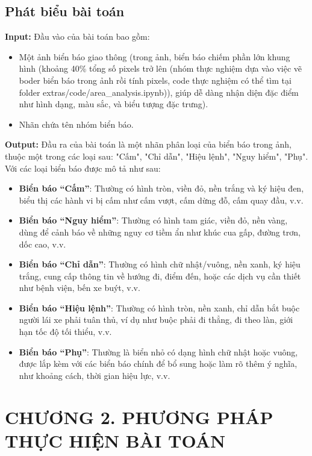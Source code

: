 \documentclass[a4paper,12pt]{article}
\begin{document}
\subsection{Phát biểu bài toán}
\textbf{Input:} Đầu vào của bài toán bao gồm: 
\begin{itemize}
    \item Một ảnh biển báo giao thông (trong ảnh, biển báo chiếm phần lớn khung hình (khoảng 40\% tổng số pixels trở lên (nhóm thực nghiệm dựa vào việc vẽ boder biển báo trong ảnh rồi tính pixels, code thực nghiệm có thể tìm tại folder extras/code/area\_analysis.ipynb)), giúp dễ dàng nhận diện đặc điểm như hình dạng, màu sắc, và biểu tượng đặc trưng).
    \item Nhãn chứa tên nhóm biển báo.
\end{itemize}
\textbf{Output:} Đầu ra của bài toán là một nhãn phân loại của biển báo trong ảnh, thuộc một trong các loại sau: "Cấm", "Chỉ dẫn", "Hiệu lệnh", "Nguy hiểm", "Phụ".\\[0.2cm]
Với các loại biển báo được mô tả như sau:
\begin{itemize}
    \item \textbf{Biển báo “Cấm”}: Thường có hình tròn, viền đỏ, nền trắng và ký hiệu đen, biểu thị các hành vi bị cấm như cấm vượt, cấm dừng đỗ, cấm quay đầu, v.v.
    \item \textbf{Biển báo “Nguy hiểm”}: Thường có hình tam giác, viền đỏ, nền vàng, dùng để cảnh báo về những nguy cơ tiềm ẩn như khúc cua gấp, đường trơn, dốc cao, v.v.
    \item \textbf{Biển báo “Chỉ dẫn”}: Thường có hình chữ nhật/vuông, nền xanh, ký hiệu trắng, cung cấp thông tin về hướng đi, điểm đến, hoặc các dịch vụ cần thiết như bệnh viện, bến xe buýt, v.v.
    \item \textbf{Biển báo “Hiệu lệnh”}: Thường có hình tròn, nền xanh, chỉ dẫn bắt buộc người lái xe phải tuân thủ, ví dụ như buộc phải đi thẳng, đi theo làn, giới hạn tốc độ tối thiểu, v.v.
    \item \textbf{Biển báo “Phụ”}: Thường là biển nhỏ có dạng hình chữ nhật hoặc vuông, được lắp kèm với các biển báo chính để bổ sung hoặc làm rõ thêm ý nghĩa, như khoảng cách, thời gian hiệu lực, v.v.
\end{itemize}

\newpage
\section*{\centering CHƯƠNG 2. PHƯƠNG PHÁP THỰC HIỆN BÀI TOÁN}
\vspace{1cm}
\setcounter{section}{2}
\setcounter{subsection}{0}
\end{document}
